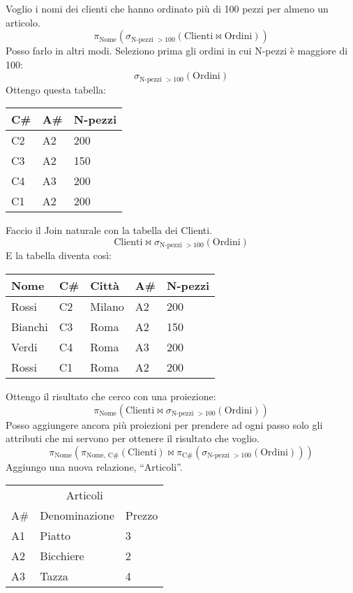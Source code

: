 Voglio i nomi dei clienti che hanno ordinato pi\`u di 100 pezzi per almeno un articolo.
\[
\pi_{\text{Nome}} \left( \sigma_{\text{N-pezzi } > 100} \left( \text{Clienti} \Join \text{Ordini} \right) \right)
\]
Posso farlo in altri modi. Seleziono prima gli ordini in cui N-pezzi \`e maggiore di 100:
\[
\sigma_{\text{N-pezzi } > 100} \left( \text{Ordini} \right)
\]
Ottengo questa tabella:

\begin{center}
\begin{tabular}{*{3}{l}}
C\# & A\# & N-pezzi \\
\hline
C2 & A2 & 200 \\
C3 & A2 & 150 \\
C4 & A3 & 200 \\
C1 & A2 & 200 \\
\end{tabular}
\end{center}

Faccio il Join naturale con la tabella dei Clienti.
\[
\text{Clienti} \Join \sigma_{\text{N-pezzi } > 100} \left( \text{Ordini} \right)
\]
E la tabella diventa cos\`i:

\begin{center}
\begin{tabular}{*{5}{l}}
Nome & C\# & Citt\`a & A\# & N-pezzi \\
\hline
Rossi & C2 & Milano & A2 & 200 \\
Bianchi & C3 & Roma & A2 & 150 \\
Verdi & C4 & Roma & A3 & 200 \\
Rossi & C1 & Roma & A2 & 200 \\
\end{tabular}
\end{center}

Ottengo il risultato che cerco con una proiezione:
\[
\pi_{\text{Nome}} \left(
\text{Clienti} \Join \sigma_{\text{N-pezzi } > 100} \left( \text{Ordini} \right) \right)
\]
Posso aggiungere ancora pi\`u proiezioni per prendere ad ogni passo solo gli attributi che mi servono per ottenere il risultato che voglio.
\[
\pi_{\text{Nome}} \left(
\pi_{\text{Nome, C\#}} \left(
\text{Clienti} \right)
\Join
\pi_{\text{C\#}} \left(
\sigma_{\text{N-pezzi } > 100} \left( \text{Ordini} \right) \right)
\right)
\]
Aggiungo una nuova relazione, ``Articoli''.

\begin{center}
\begin{tabular}{*{3}{l}}
\multicolumn{3}{c}{Articoli} \\
A\# & Denominazione & Prezzo \\
\hline
A1 & Piatto & 3 \\
A2 & Bicchiere & 2 \\
A3 & Tazza & 4 \\
\end{tabular}
\end{center}

